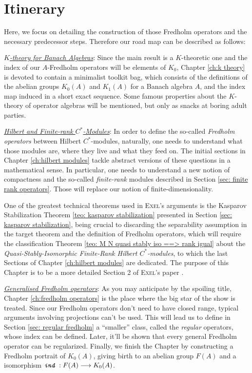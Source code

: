 \section*{Itinerary}
\thispagestyle{empty}
Here, we focus on detailing the construction of those Fredholm operators and the necessary predecessor steps. Therefore our road map can be described as follows:
\begin{itroman}
	\item \underline{\textit{$K$-theory for Banach Algebras}}: Since the main result is a $K$-theoretic one and the index of our $A$-Fredholm operators will be elements of $K_0$, Chapter \ref{ch:k theory} is devoted to contain a minimalist toolkit bag, which consists of the definitions of the abelian groups $K_0(A)$ and $K_1(A)$ for a Banach algebra $A$, and the index map induced in a short exact sequence. Some famous properties about the $K$-theory of operator algebras will be mentioned, but only as snacks at boring adult parties.
	\item \underline{\textit{Hilbert and Finite-rank \ensuremath{C^*}-Modules}}: In order to define the so-called \textit{Fredholm operators} between Hilbert $C^*$-modules, naturally, one needs to understand what those modules are, where they live and what they feed on. The initial sections in Chapter \ref{ch:hilbert modules} tackle abstract versions of these questions in a mathematical sense. In particular, one needs to understand a new notion of compactness and the so-called  \textit{finite-rank} modules described in Section \ref{sec: finite rank operators}. Those will replace our notion of finite-dimensionality. 
	
	One of the greatest technical theorems used in \textsc{Exel}'s arguments is the Kasparov Stabilization Theorem \ref{teo: kasparov stabilization} presented in Section \ref{sec: kasparov stabilization}, being crucial to discarding the separability assumption in the target theorem and the definition of Fredholm operators, which will require the classification Theorem \ref{teo: M N quasi stably iso ==> rank igual} about the \textit{Quasi-Stably-Isomorphic Finite-Rank Hilbert $C^*$-modules}, to which the last Sections of Chapter \ref{ch:hilbert modules} are dedicated. The purpose of this Chapter is to be a more detailed Section 2 of \textsc{Exel}'s paper \cite{exel7fredholm}.
	
	\item \underline{\textit{Generalised Fredholm operators}}: As you may anticipate by the spoiling title, Chapter \ref{ch:fredholm operators} is the place where the big star of the show is treated. Since our Fredholm operators don't need to have closed range, typical arguments involving projections can't be used. This will lead us to define in Section \ref{sec: regular fredholm} a ``smaller'' class, called the \textit{regular} operators, whose index can be defined. Later, it'll be shown that every general Fredholm operator can be regularized. Finally, we finish the Chapter by constructing a Fredholm portrait of $K_0(A)$, giving birth to an abelian group $F(A)$ and a isomorphism $\texttt{\textit{ind}}\, : F(A) \longrightarrow K_0(A)$.
	

\end{itroman}
